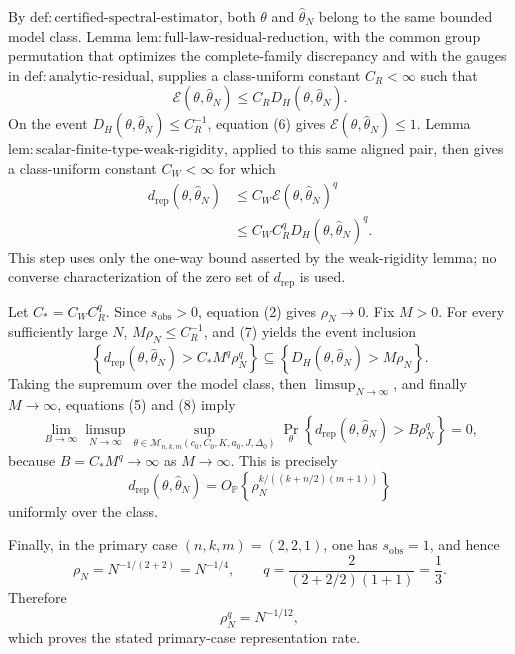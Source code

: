By \(\mathrm{def:certified\text{-}spectral\text{-}estimator}\), both \(\theta\) and \(\widehat\theta_N\) belong to the same bounded model class. Lemma \(\mathrm{lem:full\text{-}law\text{-}residual\text{-}reduction}\), with the common group permutation that optimizes the complete-family discrepancy and with the gauges in \(\mathrm{def:analytic\text{-}residual}\), supplies a class-uniform constant \(C_R<\infty\) such that
\[
\mathcal E(\theta,\widehat\theta_N)
\leq C_R D_H(\theta,\widehat\theta_N).
\tag{6}
\]
On the event \(D_H(\theta,\widehat\theta_N)\leq C_R^{-1}\), equation (6) gives \(\mathcal E(\theta,\widehat\theta_N)\leq1\). Lemma \(\mathrm{lem:scalar\text{-}finite\text{-}type\text{-}weak\text{-}rigidity}\), applied to this same aligned pair, then gives a class-uniform constant \(C_W<\infty\) for which
\[
\begin{aligned}
d_{\mathrm{rep}}(\theta,\widehat\theta_N)
&\leq C_W\mathcal E(\theta,\widehat\theta_N)^q\\
&\leq C_W C_R^qD_H(\theta,\widehat\theta_N)^q.
\end{aligned}
\tag{7}
\]
This step uses only the one-way bound asserted by the weak-rigidity lemma; no converse characterization of the zero set of \(d_{\mathrm{rep}}\) is used.

Let \(C_*=C_WC_R^q\). Since \(s_{\mathrm{obs}}>0\), equation (2) gives \(\rho_N\to0\). Fix \(M>0\). For every sufficiently large \(N\), \(M\rho_N\leq C_R^{-1}\), and (7) yields the event inclusion
\[
\left\{d_{\mathrm{rep}}(\theta,\widehat\theta_N)>C_*M^q\rho_N^q\right\}
\subseteq
\left\{D_H(\theta,\widehat\theta_N)>M\rho_N\right\}.
\tag{8}
\]
Taking the supremum over the model class, then \(\limsup_{N\to\infty}\), and finally \(M\to\infty\), equations (5) and (8) imply
\[
\lim_{B\to\infty}\limsup_{N\to\infty}
\sup_{\theta\in\mathcal M_{n,k,m}(c_0,C_0,K,a_0,J,\Delta_0)}
\Pr_\theta\!\left\{
d_{\mathrm{rep}}(\theta,\widehat\theta_N)>B\rho_N^q
\right\}=0,
\tag{9}
\]
because \(B=C_*M^q\to\infty\) as \(M\to\infty\). This is precisely
\[
d_{\mathrm{rep}}(\theta,\widehat\theta_N)
=O_{\mathbb P}\!\left\{\rho_N^{k/((k+n/2)(m+1))}\right\}
\]
uniformly over the class.

Finally, in the primary case \((n,k,m)=(2,2,1)\), one has \(s_{\mathrm{obs}}=1\), and hence
\[
\rho_N=N^{-1/(2+2)}=N^{-1/4},
\qquad
q=\frac{2}{(2+2/2)(1+1)}=\frac13.
\tag{10}
\]
Therefore
\[
\rho_N^q=N^{-1/12},
\]
which proves the stated primary-case representation rate.
